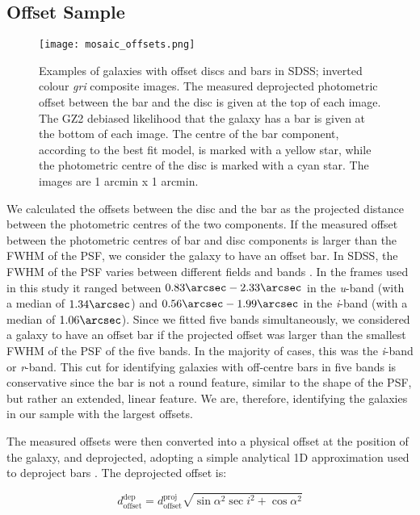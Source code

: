 \documentclass[a4paper,fleqn,usenatbib,useAMS]{mnras}
\begin{document}
\subsection{Offset Sample}

\begin{figure*}
 \texttt{[image: mosaic\_offsets.png]}
 \caption{Examples of galaxies with offset discs and bars in SDSS; inverted colour \textit{gri} composite images. The measured deprojected photometric offset between the bar and the disc is given at the top of each image. The GZ2 debiased likelihood that the galaxy has a bar is given at the bottom of each image. The centre of the bar component, according to the best fit model, is marked with a yellow star, while the photometric centre of the disc is marked with a cyan star. The images are 1 arcmin x 1 arcmin.}
 \label{offset_mosaic}
\end{figure*}

We calculated the offsets between the disc and the bar as the projected distance between the photometric centres of the two components. If the measured offset between the photometric centres of bar and disc components is larger than the FWHM of the PSF, we consider the galaxy to have an offset bar. In SDSS, the FWHM of the PSF varies between different fields and bands \citep{Bramich2012}. In the frames used in this study it ranged between $0.83\arcsec-2.33\arcsec$ in the \textit{u}-band (with a median of $1.34\arcsec$) and $0.56\arcsec-1.99\arcsec$ in the \textit{i}-band (with a median of $1.06\arcsec$). Since we fitted five bands simultaneously, we considered a galaxy to have an offset bar if the projected offset was larger than the smallest FWHM of the PSF of the five bands. In the majority of cases, this was the \textit{i}-band or \textit{r}-band. This cut for identifying galaxies with off-centre bars in five bands is conservative since the bar is not a round feature, similar to the shape of the PSF, but rather an extended, linear feature. We are, therefore, identifying the galaxies in our sample with the largest offsets.

The measured offsets were then converted into a physical offset at the position of the galaxy, and deprojected, adopting a simple analytical 1D approximation used to deproject bars \citep{Martin1995, Gadotti2007}. The deprojected offset is:

\begin{equation}
d^{\mathrm{dep}}_{\mathrm{offset}}= d^{\mathrm{proj}}_{\mathrm{offset}} \sqrt{\sin{\alpha}^2 \sec{i}^2+\cos{\alpha}^2}
\label{eqn}
\end{equation}
\end{document}
